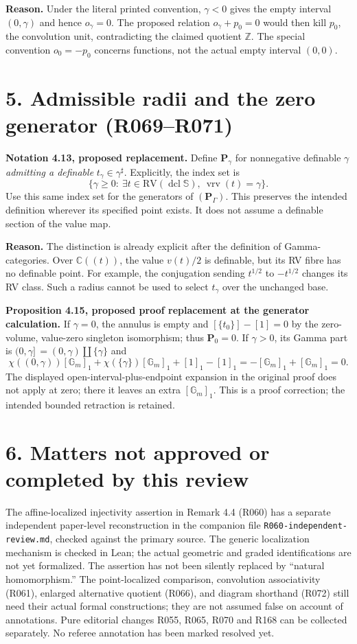 \documentclass[11pt]{article}
\newcommand{\RV}{\mathrm{RV}}
\newcommand{\Gm}{\mathbb G_m}
\begin{document}
\noindent\textbf{Reason.} Under the literal printed convention,
$\gamma<0$ gives the empty interval $(0,\gamma)$ and hence $o_\gamma=0$.
The proposed relation $o_\gamma+p_0=0$ would then kill $p_0$, the
convolution unit, contradicting the claimed quotient $\mathbb Z$.
The special convention $o_0=-p_0$ concerns functions, not the actual
empty interval $(0,0)$.

\section*{5. Admissible radii and the zero generator (R069--R071)}
\textbf{Notation 4.13, proposed replacement.}
Define $\boldsymbol P_\gamma$ for nonnegative definable $\gamma$
\emph{admitting a definable} $t_\gamma\in\gamma^\sharp$. Explicitly,
the index set is
\[
 \{\gamma\geq0:\ \exists t\in\RV(\operatorname{dcl}\mathbb S),\
                  \operatorname{vrv}(t)=\gamma\}.
\]
Use this same index set for the generators of $(\boldsymbol P_\Gamma)$.
This preserves the intended definition wherever its specified point exists.
It does not assume a definable section of the value map.

\noindent\textbf{Reason.} The distinction is already explicit after the
definition of Gamma-categories. Over $\mathbb C((t))$, the value
$v(t)/2$ is definable, but its RV fibre has no definable point.
For example, the conjugation sending $t^{1/2}$ to $-t^{1/2}$ changes
its RV class. Such a radius cannot be used to select $t_\gamma$ over
the unchanged base.

\medskip\noindent\textbf{Proposition 4.15, proposed proof replacement at
the generator calculation.} If $\gamma=0$, the annulus is empty and
$[\{t_0\}]-[1]=0$ by the zero-volume, value-zero singleton isomorphism;
thus $\boldsymbol P_0=0$. If $\gamma>0$, its Gamma part is
$(0,\gamma]\,=(0,\gamma)\amalg\{\gamma\}$ and
\[
 \chi((0,\gamma))[\Gm]_1+
 \chi(\{\gamma\})[\Gm]_1+[1]_1-[1]_1
 =-[\Gm]_1+[\Gm]_1=0.
\]
The displayed open-interval-plus-endpoint expansion in the original proof
does not apply at zero; there it leaves an extra $[\Gm]_1$.
This is a proof correction; the intended bounded retraction is retained.

\section*{6. Matters not approved or completed by this review}
The affine-localized injectivity assertion in Remark 4.4 (R060) has a
separate independent paper-level reconstruction in the companion file
\texttt{R060-independent-review.md}, checked against the primary source.
The generic localization mechanism is checked in Lean; the actual geometric
and graded identifications are not yet formalized.
The assertion has not been silently replaced by ``natural homomorphism.''
The point-localized comparison, convolution associativity (R061), enlarged
alternative quotient (R066), and diagram shorthand (R072) still need their
actual formal constructions; they are not assumed false on account of
annotations. Pure editorial changes R055, R065, R070 and R168 can be
collected separately. No referee annotation has been marked resolved yet.
\end{document}
